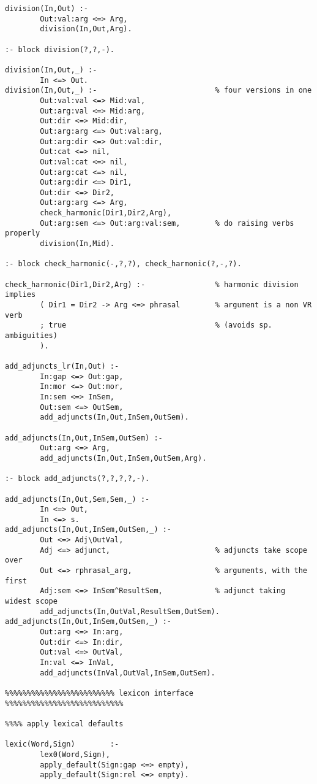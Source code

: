 \begin{verbatim}
division(In,Out) :-
        Out:val:arg <=> Arg,
        division(In,Out,Arg).
        
:- block division(?,?,-).

division(In,Out,_) :-
        In <=> Out.
division(In,Out,_) :-                           % four versions in one
        Out:val:val <=> Mid:val,
        Out:arg:val <=> Mid:arg,
        Out:dir <=> Mid:dir,
        Out:arg:arg <=> Out:val:arg,
        Out:arg:dir <=> Out:val:dir,
        Out:cat <=> nil,
        Out:val:cat <=> nil,
        Out:arg:cat <=> nil,
        Out:arg:dir <=> Dir1,
        Out:dir <=> Dir2,
        Out:arg:arg <=> Arg,
        check_harmonic(Dir1,Dir2,Arg),
        Out:arg:sem <=> Out:arg:val:sem,        % do raising verbs properly
        division(In,Mid).
        
:- block check_harmonic(-,?,?), check_harmonic(?,-,?).

check_harmonic(Dir1,Dir2,Arg) :-                % harmonic division implies
        ( Dir1 = Dir2 -> Arg <=> phrasal        % argument is a non VR verb
        ; true                                  % (avoids sp. ambiguities)
        ).

add_adjuncts_lr(In,Out) :-
        In:gap <=> Out:gap,
        In:mor <=> Out:mor,
        In:sem <=> InSem,
        Out:sem <=> OutSem,                     
        add_adjuncts(In,Out,InSem,OutSem).
        
add_adjuncts(In,Out,InSem,OutSem) :-
        Out:arg <=> Arg,
        add_adjuncts(In,Out,InSem,OutSem,Arg).
        
:- block add_adjuncts(?,?,?,?,-).
        
add_adjuncts(In,Out,Sem,Sem,_) :-
        In <=> Out,
        In <=> s.
add_adjuncts(In,Out,InSem,OutSem,_) :-          
        Out <=> Adj\OutVal,                     
        Adj <=> adjunct,                        % adjuncts take scope over
        Out <=> rphrasal_arg,                   % arguments, with the first 
        Adj:sem <=> InSem^ResultSem,            % adjunct taking widest scope
        add_adjuncts(In,OutVal,ResultSem,OutSem).       
add_adjuncts(In,Out,InSem,OutSem,_) :-
        Out:arg <=> In:arg,
        Out:dir <=> In:dir,
        Out:val <=> OutVal,
        In:val <=> InVal,
        add_adjuncts(InVal,OutVal,InSem,OutSem).
        
%%%%%%%%%%%%%%%%%%%%%%%%% lexicon interface %%%%%%%%%%%%%%%%%%%%%%%%%%%

%%%% apply lexical defaults

lexic(Word,Sign)        :-
        lex0(Word,Sign),
        apply_default(Sign:gap <=> empty),
        apply_default(Sign:rel <=> empty).


\end{verbatim}
